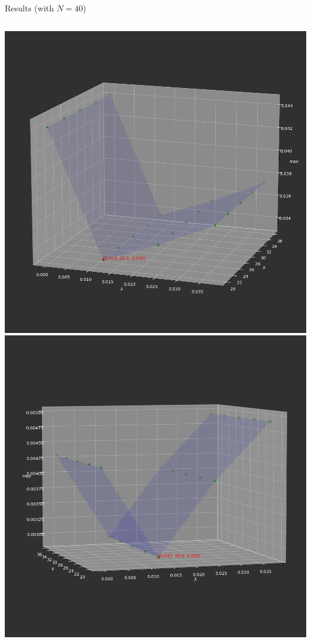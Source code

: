 \begin{frame}{Results (with $N = 40$)}
\centering
\begin{columns}
\centering
\includegraphics[scale=0.15]{images/results/anisotropic/plot_mae.png}
\centering
\includegraphics[scale=0.15]{images/results/anisotropic/plot_mse.png}
\end{columns}
\end{frame}

